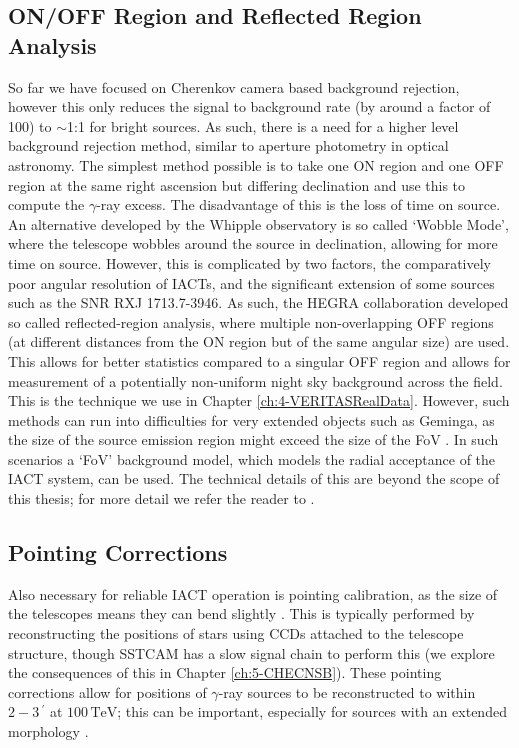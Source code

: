 \subsection{ON/OFF Region and Reflected Region Analysis}
So far we have focused on Cherenkov camera based background rejection, however this only reduces the signal to background rate (by around a factor of 100) to $\sim$1:1 for bright sources. As such, there is a need for a higher level background rejection method, similar to aperture photometry in optical astronomy. The simplest method possible is to take one ON region and one OFF region at the same right ascension but differing declination and use this to compute the $\gamma$-ray excess. The disadvantage of this is the loss of time on source. An alternative developed by the Whipple observatory is so called `Wobble Mode', where the telescope wobbles around the source in declination, allowing for more time on source. However, this is complicated by two factors, the comparatively poor angular resolution of IACTs, and the significant extension of some sources such as the SNR RXJ 1713.7-3946. As such, the HEGRA collaboration \cite{HEGRA} developed so called reflected-region analysis, where multiple non-overlapping OFF regions (at different distances from the ON region but of the same angular size) are used. This allows for better statistics compared to a singular OFF region and allows for measurement of a potentially non-uniform night sky background across the field. This is the technique we use in Chapter \ref{ch:4-VERITASRealData}. However, such methods can run into difficulties for very extended objects such as Geminga, as the size of the source emission region might exceed the size of the FoV \cite{geminga}. In such scenarios a `FoV' background model, which models the radial acceptance of the IACT system, can be used. The technical details of this are beyond the scope of this thesis; for more detail we refer the reader to \cite{Berge07,geminga}. 

\subsection{Pointing Corrections}
Also necessary for reliable IACT operation is pointing calibration, as the size of the telescopes means they can bend slightly \cite{veritasstat}. This is typically performed by reconstructing the positions of stars using CCDs attached to the telescope structure, though SSTCAM has a slow signal chain to perform this (we explore the consequences of this in Chapter \ref{ch:5-CHECNSB}). These pointing corrections allow for positions of $\gamma$-ray sources to be reconstructed to within $\mathrm{2-3}\,^\prime$ at $100\,\mathrm{TeV}$; this can be important, especially for sources with an extended morphology \cite{cena,rxjcta}.

